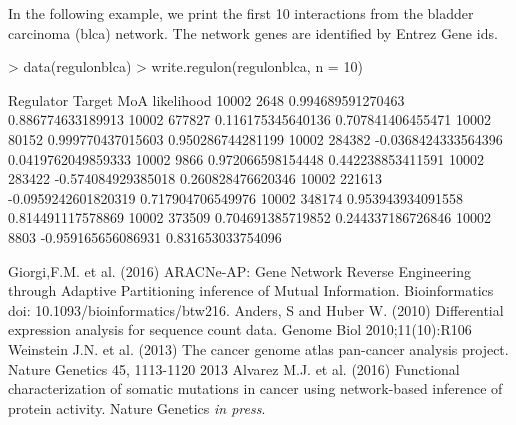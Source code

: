 \documentclass{article}
\begin{document}
In the following example, we print the first 10 interactions from the bladder carcinoma (blca) network. The network genes are identified by Entrez Gene ids.
\begin{Schunk}
\begin{Sinput}
> data(regulonblca)
> write.regulon(regulonblca, n = 10)
\end{Sinput}
\begin{Soutput}
Regulator	Target	MoA	likelihood
10002	2648	0.994689591270463	0.886774633189913
10002	677827	0.116175345640136	0.707841406455471
10002	80152	0.999770437015603	0.950286744281199
10002	284382	-0.0368424333564396	0.0419762049859333
10002	9866	0.972066598154448	0.442238853411591
10002	283422	-0.574084929385018	0.260828476620346
10002	221613	-0.0959242601820319	0.717904706549976
10002	348174	0.953943934091558	0.814491117578869
10002	373509	0.704691385719852	0.244337186726846
10002	8803	-0.959165656086931	0.831653033754096
\end{Soutput}
\end{Schunk}

\begin{thebibliography}{00}
 Giorgi,F.M. et al. (2016) ARACNe-AP: Gene Network Reverse Engineering through Adaptive Partitioning inference of Mutual Information. Bioinformatics doi: 10.1093/bioinformatics/btw216.
 Anders, S and Huber W. (2010) Differential expression analysis for sequence count data. Genome Biol 2010;11(10):R106
 Weinstein J.N. et al. (2013) The cancer genome atlas pan-cancer analysis project. Nature Genetics 45, 1113-1120 2013
 Alvarez M.J. et al. (2016) Functional characterization of somatic mutations in cancer using network-based inference of protein activity. Nature Genetics \emph{in press}.
\end{thebibliography}

\end{document}
